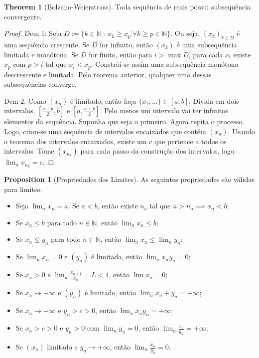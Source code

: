 \documentclass[10pt]{article}
\theoremstyle{definition}
\newtheorem{theorem}{Theorem}
\newtheorem{proposition}{Proposition}
\begin{document}
\begin{theorem}[Bolzano-Weierstrass]
	Toda sequência de reais possui subsequência convergente.
\end{theorem}
\begin{proof}
	Dem 1: Seja $D:=\{k \in \mathbb N \ : \ x_k \geq x_p \ \forall k \geq p \in \mathbb N \}$. Ou seja, $(x_k)_{k\in D}$ é
	uma sequência crescente. Se $D$ for infinito, então $(x_k)$ é uma subsequência limitada e monótona.
	Se $D$ for finito, então para $i > \max D$, para cada $x_i$ existe $x_p$ com $p > i$ tal que
	$x_i < x_p$. Constrói-se assim uma subsequência monótona descrescente e limitada. Pelo teorema anterior, qualquer
	uma dessas subsequências converge.

	Dem 2: Como $(x_n)$ é limitado, então faça $\{x_1,...\} \in [a,b]$. Divida em dois intervalos,
	$[\frac{a+b}{2},b]$ e $[a,\frac{a+b}{2}]$. Pelo menos um intervalo vai ter infinitos elementos da sequência.
	Suponha que seja o primeiro. Agora repita o processo. Logo, criou-se uma sequência de intervalos
	encaixados que contém $(x_n)$. Usando o teorema dos intervalos encaixados, existe um $c$ que pertence
	a todos os intervalos. Tome $(x_{n_k})$ para cada passo da construção dos intervalos, logo
	$\lim_n x_{n_k} = c$.
\end{proof}

\begin{proposition}[Propriedades dos Limites]
	As seguintes propriedades são válidas para limites:
	\begin{itemize}
		\item Seja $\lim_n x_n = a$. Se $a<b$, então existe $n_o$ tal que $n>n_o \implies x_n < b$;
		\item Se $x_n \leq b$ para todo $n \in \mathbb N$, então $\lim_n x_n \leq b$;
		\item Se $x_n \leq y_n$ para todo $n \in \mathbb N$, então $\lim_n x_n \leq \lim_n y_n$;
		\item Se $\lim_n x_n = 0$ e $(y_n)$ é limitada, então $\lim_n x_n y_n =0 $;
		\item Se $x_n>0$ e $\lim_n \frac{x_{n+1}}{x_n} = L < 1$, então $\lim x_n = 0$;
		\item Se $x_n \to +\infty$ e $(y_n)$ é limitado, então $\lim_n x_n + y_n = +\infty$;
		\item Se $x_n \to +\infty$ e $y_n > c > 0$, então $\lim_n x_n y_n = +\infty$;
		\item Se $x_n > c >0$ e $y_n >0$ com $\lim_n y_n = 0$, então $\lim_n \frac{x_n}{y_n}= +\infty$;
		\item Se $(x_n)$ limitado e $y_n \to +\infty$, então $\lim_n \frac{x_n}{y_n} = 0$.
	\end{itemize}
\end{proposition}
\end{document}
